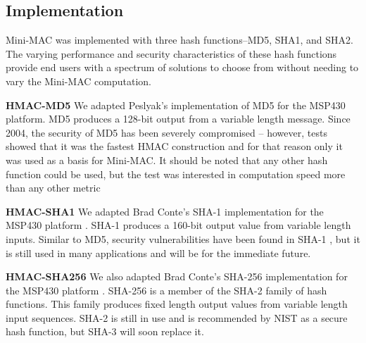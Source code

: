 \subsection{Implementation}
Mini-MAC was implemented with three hash functions--MD5, SHA1, and SHA2. The varying performance and security characteristics of these hash functions provide end users with a spectrum of solutions to choose from without needing to vary the Mini-MAC computation.

\textbf{HMAC-MD5}
We adapted Peslyak's implementation of MD5 for the MSP430 platform. MD5 produces a 128-bit output from a variable length message. Since 2004, the security of MD5 has been severely compromised \cite{Wang-MD5} -- however, tests showed that it was the fastest HMAC construction and for that reason only it was used as a basis for Mini-MAC. It should be noted that any other hash function could be used, but the test was interested in computation speed more than any other metric\cite{MD5}


\textbf{HMAC-SHA1}
We adapted Brad Conte's SHA-1 implementation for the MSP430 platform \cite{Conte-SHA1}. SHA-1 produces a 160-bit output value from variable length inputs. Similar to MD5, security vulnerabilities have been found in SHA-1 \cite{Wang-SHA1}, but it is still used in many applications and will be for the immediate future\cite{FIPS-180-4}.

\textbf{HMAC-SHA256}
We also adapted Brad Conte's SHA-256 implementation for the MSP430 platform \cite{Conte-SHA256}. SHA-256 is a member of the SHA-2 family of hash functions. This family produces fixed length output values from variable length input sequences. SHA-2 is still in use and is recommended by NIST as a secure hash function, but SHA-3 will soon replace it\cite{FIPS-180-4}.